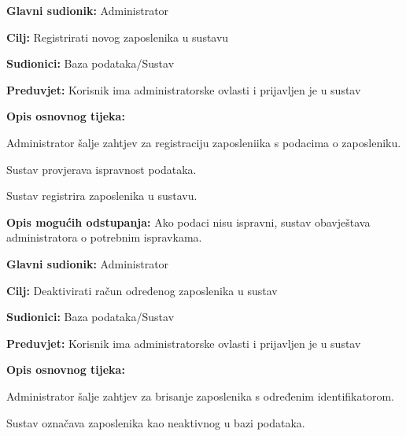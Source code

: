                 \noindent {}
					\begin{packed_item}
	
						\item \textbf{Glavni sudionik: }Administrator
						\item  \textbf{Cilj:} Registrirati novog zaposlenika u sustavu
						\item  \textbf{Sudionici:} Baza podataka/Sustav
						\item  \textbf{Preduvjet:} Korisnik ima administratorske ovlasti i prijavljen je u sustav
						\item  \textbf{Opis osnovnog tijeka:}
						
						\item[] \begin{packed_enum}
	
							\item Administrator šalje zahtjev za registraciju zaposleniika s podacima o zaposleniku.
							\item Sustav provjerava ispravnost podataka.
                            \item Sustav registrira zaposlenika u sustavu.
	
						\end{packed_enum}
						
						\item  \textbf{Opis mogućih odstupanja:} Ako podaci nisu ispravni, sustav obavještava administratora o potrebnim ispravkama.
						
						
					\end{packed_item}

                \noindent {}
					\begin{packed_item}
	
						\item \textbf{Glavni sudionik: }Administrator
						\item  \textbf{Cilj:} Deaktivirati račun određenog zaposlenika u sustav
						\item  \textbf{Sudionici:} Baza podataka/Sustav
						\item  \textbf{Preduvjet:} Korisnik ima administratorske ovlasti i prijavljen je u sustav
						\item  \textbf{Opis osnovnog tijeka:}
						
						\item[] \begin{packed_enum}
	
							\item Administrator šalje zahtjev za brisanje zaposlenika s određenim identifikatorom.
							\item Sustav označava zaposlenika kao neaktivnog u bazi podataka.
	
						\end{packed_enum}
						
						
					\end{packed_item}

